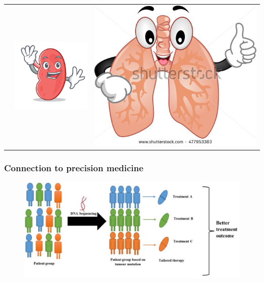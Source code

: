 \documentclass[10pt]{beamer}
\theoremstyle{definition}
\begin{document}
\begin{frame}
\begin{center}
\begin{scriptsize}
\begin{tabular}{ccc}
\vspace{.5em}
& \includegraphics[width=.2\textwidth]{kidney}
\vspace{.5em}
& \includegraphics[width=.2\textwidth]{lungs}
\vspace{.5em}
\end{tabular}
\end{scriptsize}
\end{center}
\end{frame}

\begin{frame}
\frametitle{Connection to precision medicine}

\begin{figure}
\includegraphics[width=.9\textwidth]{precision-medicine}
\end{figure}

\end{frame}
\end{document}
